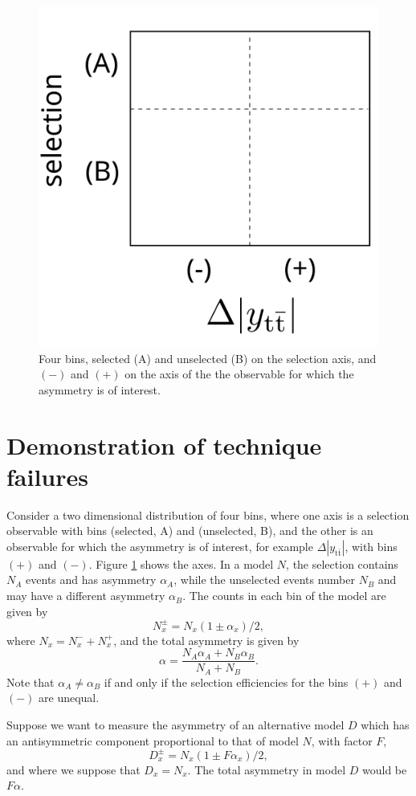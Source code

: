 \documentclass[letterpaper,11pt]{article}
\begin{document}
\begin{figure}
  \centering
  \includegraphics[width=0.3\linewidth]{axes}
  \caption{\label{axes} Four bins, selected (A) and unselected (B) on
    the selection axis, and $(-)$ and $(+)$ on the axis of the the
    observable for which the asymmetry is of interest.}
\end{figure}

\section{Demonstration of technique failures}

Consider a two dimensional distribution of four bins, where one axis
is a selection observable with bins (selected, A) and (unselected, B),
and the other is an observable for which the asymmetry is of interest,
for example $\Delta|y_{\mathrm{t\bar{t}}}|$, with bins $(+)$ and
$(-)$.  Figure \ref{axes} shows the axes. In a model $N$, the
selection contains $N_A$ events and has asymmetry $\alpha_A$, while
the unselected events number $N_B$ and may have a different asymmetry
$\alpha_B$.  The counts in each bin of the model are given by
\[N_x^{\pm} = N_x(1\pm\alpha_x)/2,\]
where $N_x=N_x^-+N_x^+$, and the total asymmetry is given by
\[\alpha = \frac{N_A\alpha_A + N_B\alpha_B}{N_A+N_B}.\]
Note that $\alpha_A\ne\alpha_B$ if and only if the selection
efficiencies for the bins $(+)$ and $(-)$ are unequal.

Suppose we want to measure the asymmetry of an alternative model $D$
which has an antisymmetric component proportional to that of model
$N$, with factor $F$,
\[D_x^{\pm} = N_x(1\pm F\alpha_x)/2,\]
and where we suppose that $D_x=N_x$.  The total asymmetry in model $D$
would be $F\alpha$.
\end{document}

